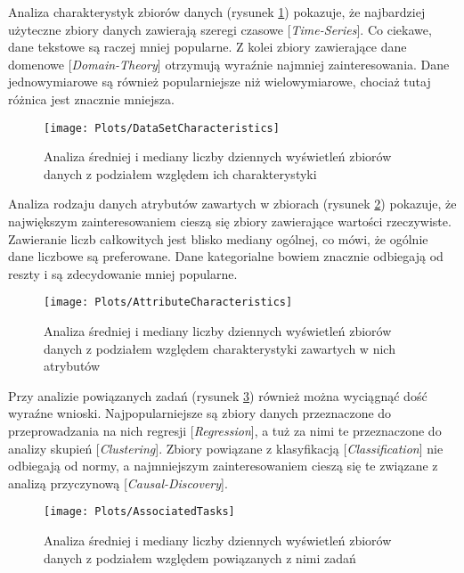 Analiza charakterystyk zbiorów danych (rysunek \ref{fig:datasetcharacteristics}) pokazuje, że najbardziej użyteczne zbiory danych zawierają szeregi czasowe [\emph{Time-Series}].
Co ciekawe, dane tekstowe są raczej mniej popularne.
Z kolei zbiory zawierające dane domenowe [\emph{Domain-Theory}] otrzymują wyraźnie najmniej zainteresowania.
Dane jednowymiarowe są również popularniejsze niż wielowymiarowe, chociaż tutaj różnica jest znacznie mniejsza.

\begin{figure}[ht]
  \texttt{[image: Plots/DataSetCharacteristics]}
  \caption{Analiza średniej i mediany liczby dziennych wyświetleń zbiorów danych z podziałem względem ich charakterystyki}
  \label{fig:datasetcharacteristics}
\end{figure}

Analiza rodzaju danych atrybutów zawartych w zbiorach (rysunek \ref{fig:attributecharacteristics}) pokazuje, że największym zainteresowaniem cieszą się zbiory zawierające wartości rzeczywiste.
Zawieranie liczb całkowitych jest blisko mediany ogólnej, co mówi, że ogólnie dane liczbowe są preferowane.
Dane kategorialne bowiem znacznie odbiegają od reszty i są zdecydowanie mniej popularne.

\begin{figure}[ht]
  \texttt{[image: Plots/AttributeCharacteristics]}
  \caption{Analiza średniej i mediany liczby dziennych wyświetleń zbiorów danych z podziałem względem charakterystyki zawartych w nich atrybutów}
  \label{fig:attributecharacteristics}
\end{figure}

Przy analizie powiązanych zadań (rysunek \ref{fig:associatedtasks}) również można wyciągnąć dość wyraźne wnioski.
Najpopularniejsze są zbiory danych przeznaczone do przeprowadzania na nich regresji [\emph{Regression}], a tuż za nimi te przeznaczone do analizy skupień [\emph{Clustering}].
Zbiory powiązane z klasyfikacją [\emph{Classification}] nie odbiegają od normy, a najmniejszym zainteresowaniem cieszą się te związane z analizą przyczynową [\emph{Causal-Discovery}].

\begin{figure}[ht]
  \texttt{[image: Plots/AssociatedTasks]}
  \caption{Analiza średniej i mediany liczby dziennych wyświetleń zbiorów danych z podziałem względem powiązanych z nimi zadań}
  \label{fig:associatedtasks}
\end{figure}

